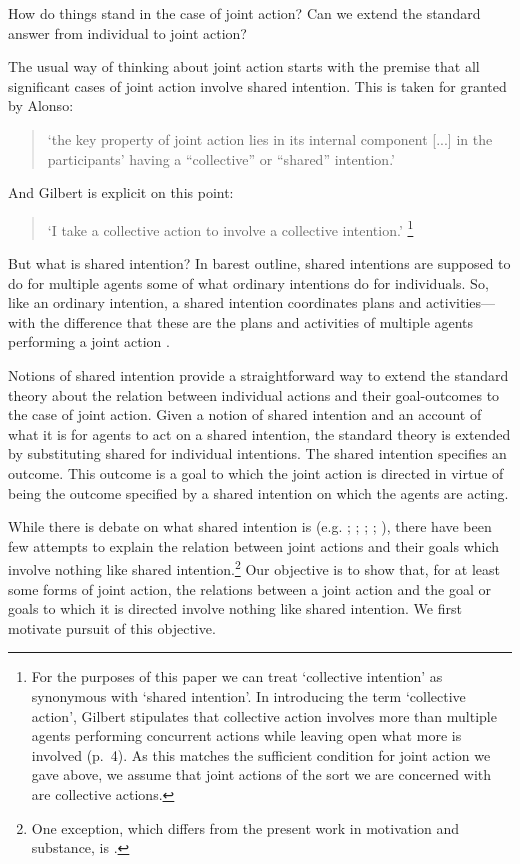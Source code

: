 \documentclass[12pt,a4paper]{extarticle}
\begin{document}

How do things stand in the case of joint action?  Can we extend the standard answer from individual to joint action?  

The usual way of thinking about joint action starts with the premise that all significant cases of joint action involve shared intention.  This is taken for granted by Alonso:
\begin{quote}
`the key property of joint action lies in its internal component [...] in the participants’ having a “collective” or “shared” intention.' \citep[pp. 444-5]{alonso_shared_2009}
\end{quote}
And Gilbert is explicit on this point:  
\begin{quote} 
`I take a collective action to involve a collective intention.'  \citep[p.\ 5]{Gilbert:2006wr}\footnote{
For the purposes of this paper we can treat `collective intention' as synonymous with `shared intention'.  
In introducing the term `collective action', Gilbert stipulates that collective action involves more than multiple agents performing concurrent actions while leaving open what more is involved (p.\ 4).   
As this matches the sufficient condition for joint action we gave above, we assume that joint actions of the sort we are concerned with are collective actions.
}
\end{quote}
But what is shared intention?  
In barest outline, shared intentions are supposed to do for multiple agents some of what ordinary intentions do for individuals.  So, like an ordinary intention, a shared intention coordinates plans and activities---with the difference that these are the plans and activities of multiple agents performing a joint action \citep{Bratman:1993je}.


Notions of shared intention provide a straightforward way to extend the standard theory about the relation between individual actions and their goal-outcomes to the case of joint action.  
Given a notion of shared intention and an account of what it is for agents to act on a shared intention, 
the standard theory is extended by substituting shared for individual intentions.  The shared intention specifies an outcome.  This outcome is a goal to which the joint action is directed in virtue of being the outcome specified by a shared intention on which the agents are acting.

While there is debate on what shared intention is (e.g. 
	\citealp{Kutz:2000si}; 
	\citealp{Tollefsen:2005vh}; 
	\citealp{gilbert_walking_1990};
	\citealp[pp.\ 74--81]{miller_social_2001};
	\citealp{tuomela_collective_2000}), 
there have been few attempts to explain the relation between joint actions and their goals which involve nothing like shared intention.\footnote{ 
One exception, which differs from the present work in motivation and substance, is \citet{Roth:2004ki}.
}
Our objective is to show that, for at least some forms of joint action, the relations between a joint action and the goal or goals to which it is directed involve nothing like shared intention.  We first motivate pursuit of this objective.
\end{document}
